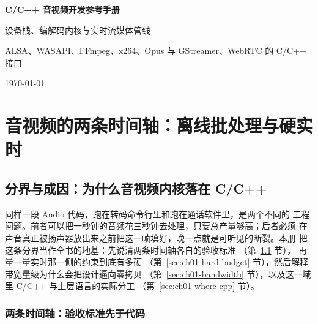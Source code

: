 \documentclass[12pt,a4paper,fontset=fandol]{ctexbook}
\newcommand{\Bk}{\discretionary{}{}{}}
\newcommand{\Lang}[1]{\textsf{#1}}
\newcommand{\CL}{\Lang{C}}
\newcommand{\CPP}{\Lang{C++}}
\newcommand{\DomAud}{\Lang{Audio}}
\begin{document}
\frontmatter

\begin{titlepage}
\centering
\vspace*{4cm}
{\Huge\bfseries C/C++ 音视频开发参考手册\par}
\vspace{1cm}
{\LARGE 设备栈、编解码内核与实时流媒体管线\par}
\vspace{0.4cm}
{\Large ALSA、WASAPI、FFmpeg、x264、Opus 与 GStreamer、WebRTC 的 C/C++ 接口\par}
\vfill
{\large \today\par}
\end{titlepage}

\tableofcontents

\mainmatter

\cleardoublepage


\part{音视频的两条时间轴：离线批处理与硬实时}

\chapter{分界与成因：为什么音视频内核落在 C/C++}
\label{ch:ch01-boundary}

同样一段 \DomAud{} 代码，跑在转码命令行里和跑在通话软件里，是两个不同的
工程问题。前者可以把一秒钟的音频花三秒钟去处理，只要总产量够高；后者必须
在声音真正被扬声器放出来之前把这一帧填好，晚一点就是可听见的断裂。本册
把这条分界当作全书的地基：先说清两条时间轴各自的验收标准
（第~\ref{sec:ch01-two-timelines} 节），
再量一量实时那一侧的约束到底有多硬
（第~\ref{sec:ch01-hard-budget} 节），然后解释带宽量级为什么会把设计逼向零拷贝
（第~\ref{sec:ch01-bandwidth} 节），以及这一域里 \CL/{\Bk}\CPP{} 与上层语言的实际分工
（第~\ref{sec:ch01-where-cpp} 节）。

\section{两条时间轴：验收标准先于代码}
\label{sec:ch01-two-timelines}
\end{document}
